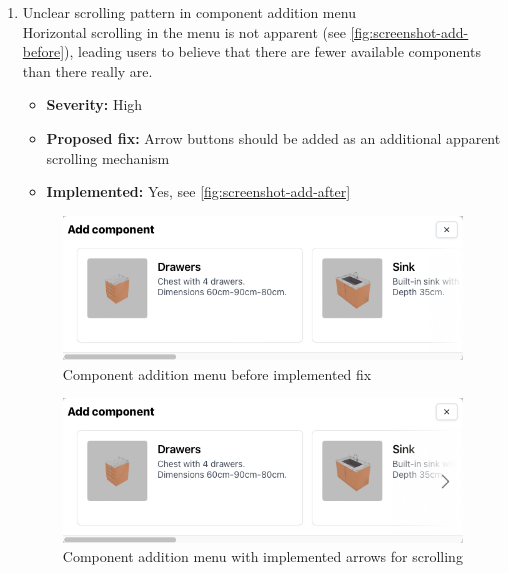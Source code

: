 \begin{enumerate}[label=\textbf{I\arabic*:}, leftmargin=*]
    \item Unclear scrolling pattern in component addition menu
        \vspace{2pt}
        \\Horizontal scrolling in the menu is not apparent (see \autoref{fig:screenshot-add-before}), leading users to believe that there are fewer available components than there really are.
        \begin{itemize}[noitemsep, label=\trianglebullet]
            \item \textbf{Severity:} High
            \item \textbf{Proposed fix:} Arrow buttons should be added as an additional apparent scrolling mechanism
            \item \textbf{Implemented:} Yes, see \autoref{fig:screenshot-add-after}
        \end{itemize}
        \vspace{4pt}

        \begin{figure}[h]
        \centering
        \includegraphics[width=0.7\linewidth]{images/screenshot_add-before.png}
        \caption{Component addition menu before implemented fix}
        \label{fig:screenshot-add-before}
        \end{figure}
        \begin{figure}[h]
        \centering
        \includegraphics[width=0.7\linewidth]{images/screenshot_add-after.png}
        \caption{Component addition menu with implemented arrows for scrolling}
        \label{fig:screenshot-add-after}
        \end{figure}
    

\end{enumerate}
